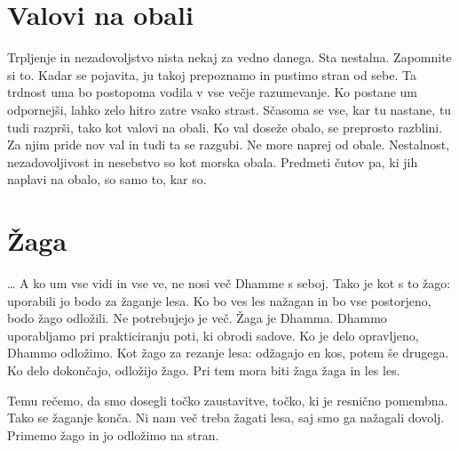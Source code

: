 \section{Valovi na obali}

Trpljenje in nezadovoljstvo nista nekaj za vedno danega. Sta nestalna. Zapomnite si to. Kadar se pojavita, ju takoj prepoznamo in pustimo stran od sebe. Ta trdnost uma bo postopoma vodila v vse večje razumevanje. Ko postane um odpornejši, lahko zelo hitro zatre vsako strast. Sčasoma se vse, kar tu nastane, tu tudi razprši, tako kot valovi na obali. Ko val doseže obalo, se preprosto razblini. Za njim pride nov val in tudi ta se razgubi. Ne more naprej od obale. Nestalnost, nezadovoljivost in nesebstvo so kot morska obala. Predmeti čutov pa, ki jih naplavi na obalo, so samo to, kar so.

\section{Žaga}

\ldots{} A ko um vse vidi in vse ve, ne nosi več Dhamme s seboj. Tako je kot s to žago: uporabili jo bodo za žaganje lesa. Ko bo ves les nažagan in bo vse postorjeno, bodo žago odložili. Ne potrebujejo je več. Žaga je Dhamma. Dhammo uporabljamo pri prakticiranju poti, ki obrodi sadove. Ko je delo opravljeno, Dhammo odložimo. Kot žago za rezanje lesa: odžagajo en kos, potem še drugega. Ko delo dokončajo, odložijo žago. Pri tem mora biti žaga žaga in les les.

Temu rečemo, da smo dosegli točko zaustavitve, točko, ki je resnično pomembna. Tako se žaganje konča. Ni nam več treba žagati lesa, saj smo ga nažagali dovolj. Primemo žago in jo odložimo na stran.

